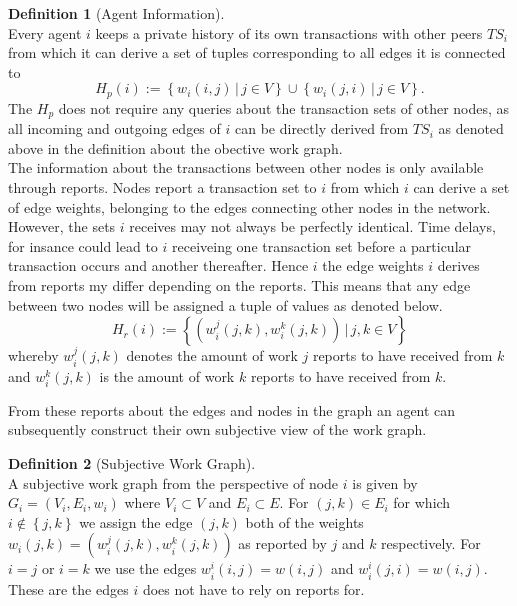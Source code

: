 \documentclass[11pt,a4paper]{report}
\theoremstyle{definition}
\newtheorem{definition}{Definition}[section]
\theoremstyle{theorem}
\theoremstyle{proposition}
\theoremstyle{corollary}
\theoremstyle{lemma}
\theoremstyle{example}
\theoremstyle{remark}
\begin{document}
\begin{definition}[Agent Information]\ \\
Every agent $i$ keeps a private history of its own transactions with other peers $TS_i$ from which it can derive a set of tuples corresponding to all edges it is connected to
\[
H_p(i):=\left\lbrace{}w_i(i,j)\,|\, j\in{}V\right\rbrace \cup \left\lbrace{}w_i(j,i)\,|\, j\in{}V\right\rbrace .
\]
\noindent{}The $H_p$ does not require any queries about the transaction sets of other nodes, as all incoming and outgoing edges of $i$ can be directly derived from $TS_i$ as denoted above in the definition about the obective work graph. \vspace{1em}\\

\noindent{}The information about the transactions between other nodes is only available through reports. Nodes report a transaction set to $i$ from which $i$ can derive a set of edge weights, belonging to the edges connecting other nodes in the network. However, the sets $i$ receives may not always be perfectly identical. Time delays, for insance could lead to $i$ receiveing one transaction set before a particular transaction occurs and another thereafter. Hence $i$ the edge weights $i$ derives from reports my differ depending on the reports. This means that any edge between two nodes will be assigned a tuple of values as denoted below.  
\[
H_r(i):=\left\lbrace{}(w_i^j(j,k),w_i^k(j,k))\,|\,j,k\in{}V\right\rbrace
\]
whereby $w_i^j(j,k)$ denotes the amount of work $j$ reports to have received from $k$ and $w_i^k(j,k)$ is the amount of work $k$ reports to have received from $k$. 
\end{definition}

\noindent{}From these reports about the edges and nodes in the graph an agent can subsequently construct their own subjective view of the work graph.

\begin{definition}[Subjective Work Graph]\ \\
A subjective work graph from the perspective of node $i$ is given by $G_i=(V_i,E_i,w_i)$ where $V_i\subset{}V$ and $E_i\subset{}E$. For $(j,k)\in{}E_i$ for which $i\not\in\left\lbrace{}j,k\right\rbrace$ we assign the edge $(j,k)$ both of the weights $w_i(j,k) = (w_i^j(j,k), w_i^k(j,k))$ as reported by $j$ and $k$ respectively. For $i=j$ or $i=k$ we use the edges $w_i^i(i,j)=w(i,j)$ and $w_i^i(j,i)=w(i,j)$. These are the edges $i$ does not have to rely on reports for.  
\end{definition}
\end{document}
